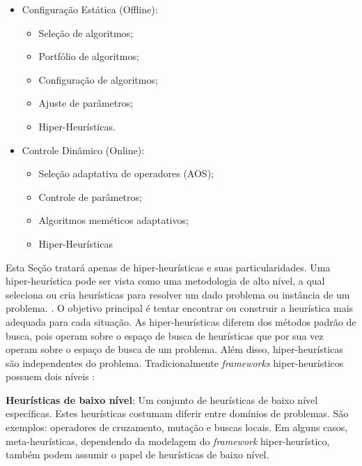 \begin{itemize}
	\item Configuração Estática (Offline):
	\begin{itemize}
		\item Seleção de algoritmos;
		\item Portfólio de algoritmos;	
		\item Configuração de algoritmos;
		\item Ajuste de parâmetros;
		\item Hiper-Heurísticas.
	\end{itemize}
	\item Controle Dinâmico (Online):
	\begin{itemize}
		\item Seleção adaptativa de operadores (AOS);
		\item Controle de parâmetros;	
		\item Algoritmos meméticos adaptativos;
		\item Hiper-Heurísticas
	\end{itemize}
	
\end{itemize}


Esta Seção tratará apenas de hiper-heurísticas e suas particularidades. Uma hiper-heurística pode ser vista como uma metodologia de alto nível, a qual seleciona ou cria heurísticas para resolver um dado problema ou instância de um problema. \cite{burke2013hyper}. O objetivo principal é tentar encontrar ou construir a heurística mais adequada para cada situação. As hiper-heurísticas diferem dos métodos padrão de busca, pois operam sobre o espaço de busca de heurísticas que por sua vez operam sobre o espaço de busca de um problema. Além disso, hiper-heurísticas são independentes do problema. Tradicionalmente \textit{frameworks} hiper-heurísticos possuem dois níveis \cite{sabar2015automatic}: 

\textbf{Heurísticas de baixo nível}:  Um conjunto de heurísticas de baixo nível específicas. Estes  heurísticas costumam diferir entre domínios de problemas. São exemplos: operadores de cruzamento, mutação e buscas locais. Em alguns casos, meta-heurísticas, dependendo da modelagem do \textit{framework} hiper-heurístico, também podem assumir o papel de heurísticas de baixo nível. 

